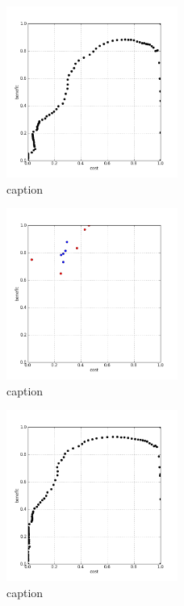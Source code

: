 %
\begin{figure}[!ht]
	\centering
	\includegraphics[width=0.5\textwidth]{img/p1figs/computeFrameStateContrastOnly_sectionCompareBetter_smooth12_tol24_AUC.png}
	\caption{caption}
\end{figure}
%
\begin{figure}[!ht]
	\centering
	\includegraphics[width=0.5\textwidth]{img/p1figs/computeFrameStateContrastOnly_sectionCompareBetter_smooth12_tol48.png}
	\caption{caption}
\end{figure}
%
\begin{figure}[!ht]
	\centering
	\includegraphics[width=0.5\textwidth]{img/p1figs/computeFrameStateContrastOnly_sectionCompareBetter_smooth12_tol48_AUC.png}
	\caption{caption}
\end{figure}
